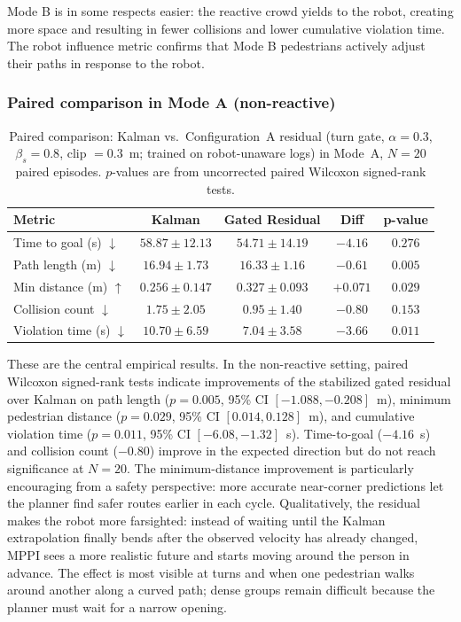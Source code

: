 \documentclass[12pt, a4paper]{article}
\begin{document}
Mode B is in some respects easier: the reactive crowd yields to the robot, creating more space and resulting in fewer collisions and lower cumulative violation time. The robot influence metric confirms that Mode B pedestrians actively adjust their paths in response to the robot.

\subsubsection*{Paired comparison in Mode A (non-reactive)}

\begin{table}[H]
\centering
\caption{Paired comparison: Kalman vs.\ Configuration~A residual (turn gate, $\alpha=0.3$, $\beta_s=0.8$, clip $=0.3$~m; trained on robot-unaware logs) in Mode~A, $N=20$ paired episodes. $p$-values are from uncorrected paired Wilcoxon signed-rank tests.}
\label{tab:modeA}
\begin{tabular}{lcccc}
\toprule
\textbf{Metric} & \textbf{Kalman} & \textbf{Gated Residual} & \textbf{Diff} & \textbf{p-value} \\
\midrule
Time to goal (s) $\downarrow$ & $58.87 \pm 12.13$ & $\mathbf{54.71 \pm 14.19}$ & $-4.16$ & $0.276$ \\
Path length (m) $\downarrow$ & $16.94 \pm 1.73$ & $\mathbf{16.33 \pm 1.16}$ & $-0.61$ & $0.005$ \\
Min distance (m) $\uparrow$ & $0.256 \pm 0.147$ & $\mathbf{0.327 \pm 0.093}$ & $+0.071$ & $0.029$ \\
Collision count $\downarrow$ & $1.75 \pm 2.05$ & $\mathbf{0.95 \pm 1.40}$ & $-0.80$ & $0.153$ \\
Violation time (s) $\downarrow$ & $10.70 \pm 6.59$ & $\mathbf{7.04 \pm 3.58}$ & $-3.66$ & $0.011$ \\
\bottomrule
\end{tabular}
\end{table}

These are the central empirical results. In the non-reactive setting, paired Wilcoxon signed-rank tests indicate improvements of the stabilized gated residual over Kalman on path length ($p=0.005$, 95\% CI $[-1.088,-0.208]$~m), minimum pedestrian distance ($p=0.029$, 95\% CI $[0.014,0.128]$~m), and cumulative violation time ($p=0.011$, 95\% CI $[-6.08,-1.32]$~s). Time-to-goal ($-4.16$~s) and collision count ($-0.80$) improve in the expected direction but do not reach significance at $N=20$. The minimum-distance improvement is particularly encouraging from a safety perspective: more accurate near-corner predictions let the planner find safer routes earlier in each cycle. Qualitatively, the residual makes the robot more farsighted: instead of waiting until the Kalman extrapolation finally bends after the observed velocity has already changed, MPPI sees a more realistic future and starts moving around the person in advance. The effect is most visible at turns and when one pedestrian walks around another along a curved path; dense groups remain difficult because the planner must wait for a narrow opening.
\end{document}
